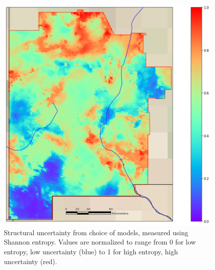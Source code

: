 \begin{figure}%
\centering
\includegraphics[width=.75\textwidth]{templates/images/Figure-Structural_Entropy_Map.png}
\caption[Structural uncertainty map]{Structural uncertainty from choice of models, measured using Shannon entropy. Values are normalized to range from 0 for low entropy, low uncertainty (blue) to 1 for high entropy, high uncertainty (red).}
\label{fig:structural_entropy_map}
\end{figure}

